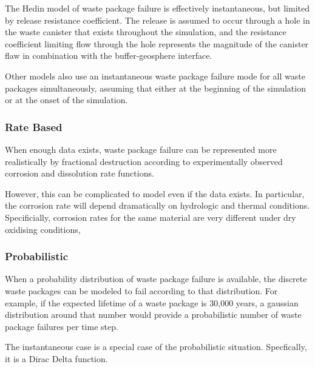 The Hedin model of waste package failure is effectively instantaneous, but
limited by release resistance coefficient. The release is assumed  to occur
through a hole in the waste canister that exists throughout the simulation, and
the resistance coefficient limiting flow through the hole represents the
magnitude of the canister flaw in combination with the buffer-geosphere
interface.  \cite{hedin_integrated_2002}

Other models also use an instantaneous waste package failure mode for all waste  
packages simultaneously, assuming that either at the beginning of the simulation
or at the onset of the simulation.

\subsubsection{Rate Based} 

When enough data exists, waste package failure can
be represented more  realistically by fractional destruction according to
experimentally observed corrosion and dissolution rate functions.

However, this can be complicated to model even if the data exists. In
particular, the corrosion rate will depend dramatically on hydrologic and
thermal conditions. Specificially, corrosion rates for the same material are
very different under dry oxidising conditions, 


\subsubsection{Probabilistic}

When a probability distribution of waste package failure is available, the 
discrete waste packages can be modeled to fail according to that distribution. 
For example, if the expected lifetime of a waste package is 30,000 years, a 
gaussian distribution around that number would provide a probabilistic number of 
waste package failures per time step. 

The instantaneous case is a special case of the probabilistic situation. 
Specfically, it is a Dirac Delta function. 

